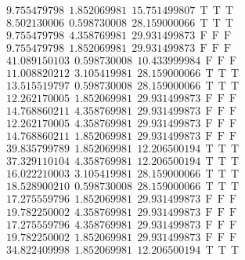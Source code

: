 \documentclass[10pt,a4paper]{article}
\begin{document}
\begin{itemize}
\begin{displaymath}
{\begin{aligned}
& 9.755479798 ~~   1.852069981 ~~  15.751499807  ~~\mathrm{T  ~~ T  ~~ T } \\ 
& 8.502130006 ~~   0.598730008 ~~  28.159000066  ~~\mathrm{T  ~~ T  ~~ T } \\ 
& 9.755479798 ~~   4.358769981 ~~  29.931499873  ~~\mathrm{F  ~~ F  ~~  F} \\ 
& 9.755479798 ~~   1.852069981 ~~  29.931499873  ~~\mathrm{F  ~~ F  ~~  F} \\ 
&41.089150103 ~~   0.598730008 ~~  10.433999984  ~~\mathrm{F  ~~ F  ~~  F} \\ 
&11.008820212 ~~   3.105419981 ~~  28.159000066  ~~\mathrm{T  ~~ T  ~~ T } \\ 
&13.515519797 ~~   0.598730008 ~~  28.159000066  ~~\mathrm{T  ~~ T  ~~ T } \\ 
&12.262170005 ~~   1.852069981 ~~  29.931499873  ~~\mathrm{F  ~~ F  ~~  F} \\ 
&14.768860211 ~~   4.358769981 ~~  29.931499873  ~~\mathrm{F  ~~ F  ~~  F} \\ 
&12.262170005 ~~   4.358769981 ~~  29.931499873  ~~\mathrm{F  ~~ F  ~~  F} \\ 
&14.768860211 ~~   1.852069981 ~~  29.931499873  ~~\mathrm{F  ~~ F  ~~  F} \\ 
&39.835799789 ~~   1.852069981 ~~  12.206500194  ~~\mathrm{T  ~~ T  ~~ T } \\ 
&37.329110104 ~~   4.358769981 ~~  12.206500194  ~~\mathrm{T  ~~ T  ~~ T } \\ 
&16.022210003 ~~   3.105419981 ~~  28.159000066  ~~\mathrm{T  ~~ T  ~~ T } \\ 
&18.528900210 ~~   0.598730008 ~~  28.159000066  ~~\mathrm{T  ~~ T  ~~ T } \\ 
&17.275559796 ~~   1.852069981 ~~  29.931499873  ~~\mathrm{F  ~~ F  ~~  F} \\ 
&19.782250002 ~~   4.358769981 ~~  29.931499873  ~~\mathrm{F  ~~ F  ~~  F} \\ 
&17.275559796 ~~   4.358769981 ~~  29.931499873  ~~\mathrm{F  ~~ F  ~~  F} \\ 
&19.782250002 ~~   1.852069981 ~~  29.931499873  ~~\mathrm{F  ~~ F  ~~  F} \\ 
&34.822409998 ~~   1.852069981 ~~  12.206500194  ~~\mathrm{T  ~~ T  ~~ T } \\ 
				\end{aligned}
			}
		\end{displaymath}
		\begin{displaymath}
			\boxed{
				\begin{aligned}

\end{aligned}}
\end{displaymath}
\end{itemize}
\end{document}
